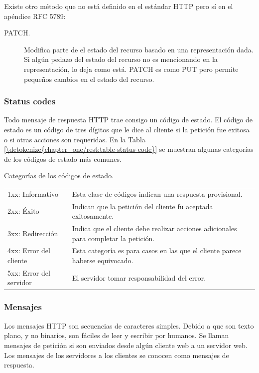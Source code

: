 Existe otro método que no está definido en el estándar HTTP pero sí en
el apéndice RFC 5789:
\begin{description}
\item[{PATCH.}] \leavevmode
Modifica parte de el estado del recurso basado en una representación
dada. Si algún pedazo del estado del recurso no es mencionando en la
representación, lo deja como está. PATCH es como PUT pero permite
pequeños cambios en el estado del recurso.

\end{description}


\subsubsection{Status codes}
\label{\detokenize{chapter_one/rest:status-codes}}
Todo mensaje de respuesta HTTP trae consigo un código de estado. El
código de estado es un código de tres dígitos que le dice al cliente si
la petición fue exitosa o si otras acciones son requeridas. En la
Tabla \ref{\detokenize{chapter_one/rest:table-status-code}} se muestran algunas categorías
de los códigos de estado más comunes.


\begin{savenotes}\sphinxattablestart
\centering
{}
\caption{Categorías de los códigos de estado. \label{\detokenize{chapter_one/rest:table-status-code}}}
\sphinxaftercaption
\begin{tabulary}{\linewidth}[t]{|T|T|}
\hline
{}\relax &\relax \\
\hline
1xx: Informativo
&
Esta clase de códigos indican una respuesta provisional.
\\
\hline
2xx: Éxito
&
Indican que la petición del cliente fu aceptada exitosamente.
\\
\hline
3xx: Redirección
&
Indica que el cliente debe realizar acciones adicionales para completar la petición.
\\
\hline
4xx: Error del cliente
&
Esta categoría es para casos en las que el cliente parece haberse equivocado.
\\
\hline
5xx: Error del servidor
&
El servidor tomar responsabilidad del error.
\\
\hline
\end{tabulary}
\par
\sphinxattableend\end{savenotes}


\subsubsection{Mensajes}
\label{\detokenize{chapter_one/rest:mensajes}}
Los mensajes HTTP son secuencias de caracteres simples. Debido a que son
texto plano, y no binarios, son fáciles de leer y escribir por humanos.
Se llaman mensajes de petición si son enviados desde algún cliente web a
un servidor web. Los mensajes de los servidores a los clientes se
conocen como mensajes de respuesta.


